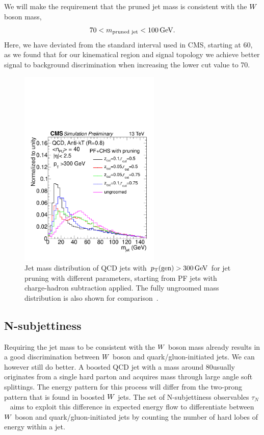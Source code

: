 We will make the requirement that the pruned jet mass is consistent with the $W$ boson mass,
\begin{equation}
  70 < m_{\textrm{pruned jet}} < 100 \,\text{Ge\hspace{-.08em}V} .
\end{equation}
Here, we have deviated from the standard interval used in CMS, starting at 60\GeV, as we found that
for our
kinematical region and signal topology we achieve better signal to background discrimination when
increasing the lower cut value to 70\GeV. 

\begin{figure}
  \centering
  \includegraphics[width=0.6\textwidth]{figures/razor_wtag/1DPFCHS_PR_QCD}
  \caption{Jet mass distribution of QCD jets with $p_{\mathrm{T}}(\textrm{gen}) > 300 \,\text{Ge\hspace{-.08em}V}$ for jet pruning
with different parameters, starting from PF jets with charge-hadron subtraction applied. The fully
ungroomed mass distribution is also shown for comparison~\cite{CMS-PAS-JME-14-001}. 
  \label{fig:wtag_jet_pruning}}
\end{figure}


\subsection{N-subjettiness}

Requiring the jet mass to be consistent with the $W$ boson mass already results in a good
discrimination between $W$ boson and quark/gluon-initiated jets. We can however still do better. A
boosted QCD jet with a mass around 80\GeV usually originates from a single hard parton and acquires
mass through large angle soft splittings. The energy pattern for this process will differ from the
two-prong pattern that is found in boosted $W$ jets.  
The set of N-subjettiness observables $\tau_N$~\cite{Thaler:2010tr} aims to exploit this difference
in expected energy flow to differentiate between $W$ boson and quark/gluon-initiated jets by
counting the number of hard lobes of energy within a jet.


